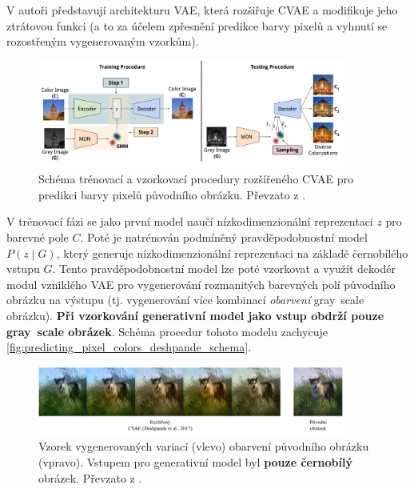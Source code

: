 V \textcite{Deshpande2017} autoři představují architekturu VAE, která rozšiřuje CVAE a modifikuje jeho ztrátovou funkci (a to za účelem zpřesnění predikce barvy pixelů a vyhnutí se rozostřeným vygenerovaným vzorkům).
\begin{figure}[H]
    \centering
    \includegraphics[width=0.9\textwidth]{figures/applications/predicting_pixel_colors_deshpande_vae_schema.png}
    \caption{Schéma trénovací a vzorkovací procedury rozšířeného CVAE pro predikci barvy pixelů původního obrázku. Převzato z \textcite{Deshpande2017}.}
    \label{fig:predicting_pixel_colors_deshpande_schema}
\end{figure}

V trénovací fázi se jako první model naučí nízkodimenzionální reprezentaci $z$ pro barevné pole $C$.
Poté je natrénován podmíněný pravděpodobnostní model $P(z \mid G)$, který generuje nízkodimenzionální reprezentaci na základě černobílého vstupu $G$. 
Tento pravděpodobnostní model lze poté vzorkovat a využít dekodér modul vzniklého VAE pro vygenerování rozmanitých barevných polí původního obrázku na výstupu (tj. vygenerování více kombinací \emph{obarvení} gray~scale obrázku).
\textbf{Při vzorkování generativní model jako vstup obdrží pouze gray~scale obrázek}. Schéma procedur tohoto modelu zachycuje \autoref{fig:predicting_pixel_colors_deshpande_schema}. \cite{Deshpande2017}

\begin{figure}[H]
    \centering
    \includegraphics[width=0.9\textwidth]{figures/applications/predicting_pixel_colors_deshpande.pdf}
    \caption{Vzorek vygenerovaných variací (vlevo) obarvení původního obrázku (vpravo). Vstupem pro generativní model byl \textbf{pouze černobílý} obrázek. Převzato z \textcite{Deshpande2017}.}
    \label{fig:predicting_pixel_colors_deshpande}
\end{figure}


